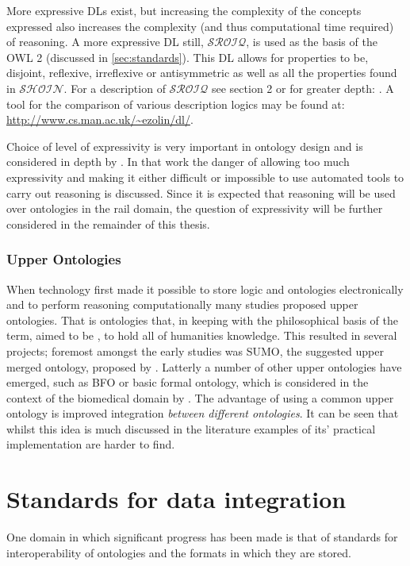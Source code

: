 More expressive DLs exist, but increasing the complexity of the concepts expressed also increases the complexity (and thus computational time required) of reasoning. A more expressive DL still, \(\mathcal{SROIQ}\), is used as the basis of the OWL 2 (discussed in \autoref{sec:standards}). This DL allows for properties to be, disjoint, reflexive, irreflexive or antisymmetric as well as all the properties found in \(\mathcal{SHOIN}\). For a description of \(\mathcal{SROIQ}\) see \citet{Horridge2012} section 2 or for greater depth: \citet{Horrocks2006}. A tool for the comparison of various description logics may be found at: \url{http://www.cs.man.ac.uk/~ezolin/dl/}.

Choice of level of expressivity is very important in ontology design and is considered in depth by \citet{Tutcher2015}. In that work the danger of allowing too much expressivity and making it either difficult or impossible to use automated tools to carry out reasoning is discussed. Since it is expected that reasoning will be used over ontologies in the rail domain, the question of expressivity will be further considered in the remainder of this thesis.

\subsubsection{Upper Ontologies}
When technology first made it possible to store logic and ontologies electronically and to perform reasoning computationally many studies proposed upper ontologies. That is ontologies that, in keeping with the philosophical basis of the term, aimed to be , to hold all of humanities knowledge. This resulted in several projects; foremost amongst the early studies was SUMO, the suggested upper merged ontology, proposed by \cite{Niles2001}. Latterly a number of other upper ontologies have emerged, such as  BFO or basic formal ontology, which is considered in the context of the biomedical domain by \citet{Grenon2004}. The advantage of using a common upper ontology is improved integration \emph{between different ontologies}. It can be seen that whilst this idea is much discussed in the literature examples of its' practical implementation are harder to find.

\section{Standards for data integration}\label{sec:standards}
One domain in which significant progress has been made is that of standards for interoperability of ontologies and the formats in which they are stored.

